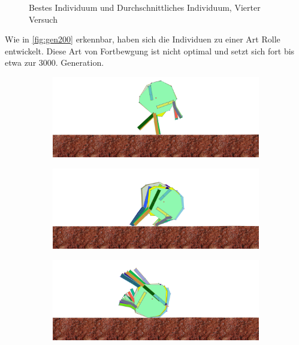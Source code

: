           \begin{figure}[H]
            \centering
            
            \caption{Bestes Individuum und Durchschnittliches Individuum, Vierter Versuch\label{fig:graphFourth}}
          \end{figure}

          Wie in \vref{fig:gen200} erkennbar, haben sich die Individuen zu einer Art Rolle entwickelt.
          Diese Art von Fortbewgung ist nicht optimal und setzt sich fort bis etwa zur 3000. Generation.

          \begin{figure}[H]
            \centering
            \begin{subfigure}[b]{0.45\textwidth}
              \includegraphics[width=\linewidth,center]{graphics/simulation-results/4_gen200_1}
              \caption{\label{fig:gen200_1}}
            \end{subfigure}
            \begin{subfigure}[b]{0.45\textwidth}
              \includegraphics[width=\linewidth,center]{graphics/simulation-results/4_gen200_2}
              \caption{\label{fig:gen200_2}}
            \end{subfigure}
            \begin{subfigure}[b]{0.45\textwidth}
              \includegraphics[width=\linewidth,center]{graphics/simulation-results/4_gen200_3}

\end{subfigure}
\end{figure}
